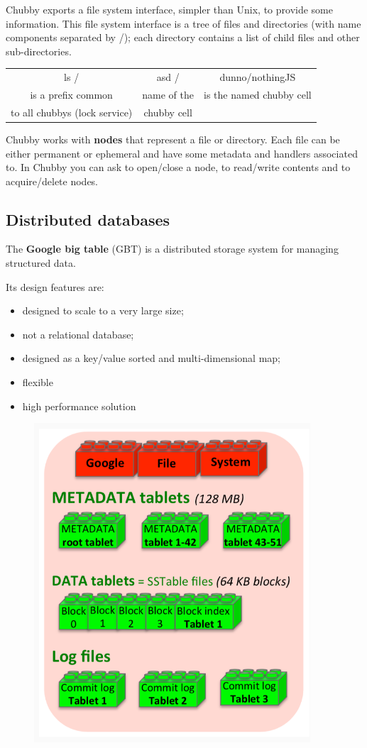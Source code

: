 Chubby exports a file system interface, simpler than Unix, to provide some information. This file system interface is a tree of files and directories (with name components separated by /); each directory contains a list of child files and other sub-directories.
\begin{table}[h!]
    \centering
    \begin{tabular}{c c c}
          ls / & asd / & dunno/nothingJS\\
          is a prefix common & name of the & is the named chubby cell\\
          to all chubbys (lock service) & chubby cell 
    \end{tabular}
\end{table}

Chubby works with \textbf{nodes} that represent a file or directory. Each file can be either permanent or ephemeral and have some metadata and handlers associated to. In Chubby you can ask to open/close a node, to read/write contents and to  acquire/delete nodes.


\subsection{Distributed databases}
The \textbf{Google big table} (GBT) is a distributed storage system for managing structured data. 

Its design features are:
\begin{itemize}
    \item designed to scale to a very large size;
    \item not a relational database;
    \item designed as a key/value sorted and multi-dimensional map;
    \item flexible
    \item high performance solution
\end{itemize}

\begin{figure}[h!]
    \centering
    \includegraphics[scale=0.35]{images/GBTstruct.png}
\end{figure}

